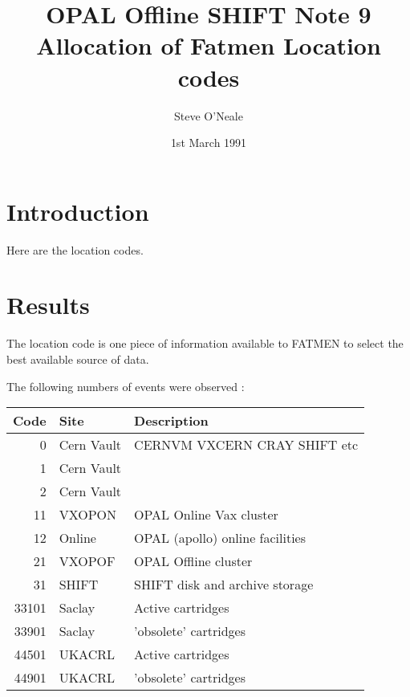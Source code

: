 
\renewcommand{\Huge}{\huge}         %
\title{OPAL Offline SHIFT Note 9  \\
Allocation of Fatmen Location codes}
\author{Steve O'Neale}
\date {1st March 1991}              %
\maketitle
 
\section{Introduction}
Here are the location codes.
 
\section{Results}
 
The location code is one piece of information available to FATMEN
to select the best available source of data.
 
The following numbers of events were observed :
%
\begin{center}               %
\begin{tabular}{|r|l|l|}
\hline                       %
Code & Site & Description \\
\hline
         0 &  Cern Vault  &   CERNVM VXCERN CRAY SHIFT etc       \\
         1 &  Cern Vault  &                                      \\
         2 &  Cern Vault  &                                      \\
        11 &  VXOPON      &   OPAL Online Vax cluster            \\
        12 &  Online      &   OPAL (apollo) online facilities    \\
        21 &  VXOPOF      &   OPAL Offline cluster               \\
        31 &  SHIFT       &   SHIFT disk and archive storage     \\
     33101 &  Saclay      &   Active cartridges                  \\
     33901 &  Saclay      &   'obsolete' cartridges              \\
     44501 &  UKACRL      &   Active cartridges                  \\
     44901 &  UKACRL      &   'obsolete' cartridges              \\
\hline
\end{tabular}
\end{center}

